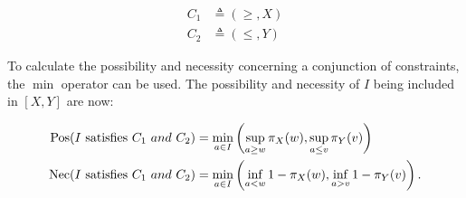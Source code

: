 \vspace{-10pt}

\begin{eqnarray}
C_1 & \triangleq\left(\geq,X\right)\\
C_2 & \triangleq\left(\leq,Y\right)
\end{eqnarray}

To calculate the possibility and necessity concerning a conjunction of constraints, the $\min$ operator can be used. The possibility and necessity of $I$ being included in $\left[X, Y\right]$ are now: 

\vspace{-10pt}

\begin{align}
\label{eq:interval-pos}
\operatorname{Pos}(I\text{ satisfies }C_1\ and\ C_2) & = \min_{a \in I}\left(\sup_{a \geq w}\pi_{X}(w),\sup_{a \leq v}\pi_{Y}(v)\right)\\
\label{eq:interval-nec}
\operatorname{Nec}(I\text{ satisfies }C_1\ and\ C_2) & = \min_{a \in I}\left(\inf_{a < w} 1-\pi_{X}(w),\inf_{a > v} 1-\pi_{Y}(v)\right).
\end{align}